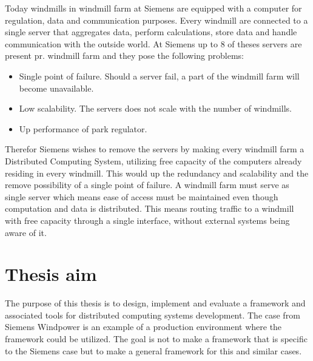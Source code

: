 Today windmills in windmill farm at Siemens are equipped with a computer for regulation, data and communication purposes. Every windmill are connected to a single server that aggregates data, perform calculations, store data and handle communication with the outside world. At Siemens up to 8 of theses servers are present pr. windmill farm and they pose the following problems:
\begin{itemize} 
	\item Single point of failure. Should a server fail, a part of the windmill farm will become unavailable.
	\item Low scalability. The servers does not scale with the number of windmills.
	\item Up performance of park regulator.
\end{itemize}

Therefor Siemens wishes to remove the servers by making every windmill farm a Distributed Computing System, utilizing free capacity of the computers already residing in every windmill. This would up the redundancy and scalability and the remove possibility of a single point of failure. A windmill farm must serve as single server which means ease of access must be maintained even though computation and data is distributed. This means routing traffic to a windmill with free capacity through a single interface, without external systems being aware of it.


\section{Thesis aim}

The purpose of this thesis is to design, implement and evaluate a framework and associated tools for distributed computing systems development. The case from Siemens Windpower is an example of a production environment where the framework could be utilized. The goal is not to make a framework that is specific to the Siemens case but to make a general framework for this and similar cases. 

